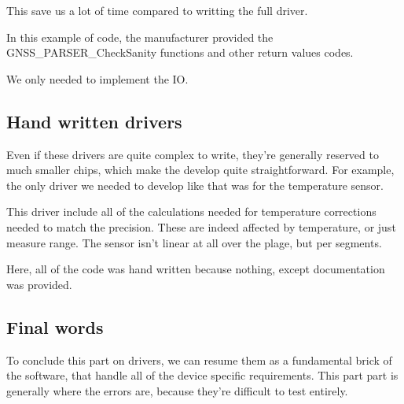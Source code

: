 This save us a lot of time compared to writting the full driver.

In this example of code, the manufacturer provided the
GNSS\_PARSER\_CheckSanity functions and other return values codes.

We only needed to implement the IO.

\subsection{Hand written drivers}
Even if these drivers are quite complex to write, they're generally reserved to
much smaller chips, which make the develop quite straightforward. For example,
the only driver we needed to develop like that was for the temperature sensor.

This driver include all of the calculations needed for temperature corrections
needed to match the precision. These are indeed affected by temperature, or
just measure range. The sensor isn't linear at all over the plage, but per
segments.

Here, all of the code was hand written because nothing, except documentation
was provided.

\subsection{Final words}
To conclude this part on drivers, we can resume them as a fundamental brick of
the software, that handle all of the device specific requirements. This part
part is generally where the errors are, because they're difficult to test
entirely.